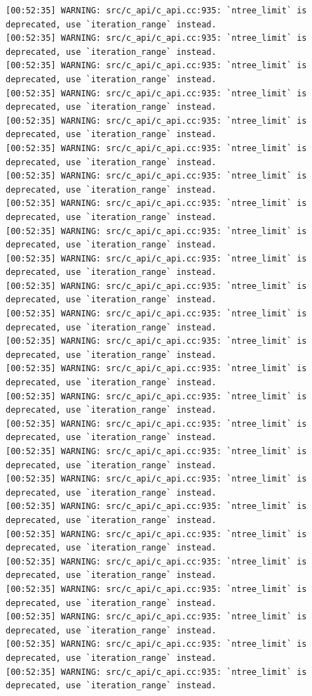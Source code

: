 \documentclass[
  letterpaper,
  DIV=11,
  numbers=noendperiod]{scrartcl}
\begin{document}
\begin{verbatim}
[00:52:35] WARNING: src/c_api/c_api.cc:935: `ntree_limit` is deprecated, use `iteration_range` instead.
[00:52:35] WARNING: src/c_api/c_api.cc:935: `ntree_limit` is deprecated, use `iteration_range` instead.
[00:52:35] WARNING: src/c_api/c_api.cc:935: `ntree_limit` is deprecated, use `iteration_range` instead.
[00:52:35] WARNING: src/c_api/c_api.cc:935: `ntree_limit` is deprecated, use `iteration_range` instead.
[00:52:35] WARNING: src/c_api/c_api.cc:935: `ntree_limit` is deprecated, use `iteration_range` instead.
[00:52:35] WARNING: src/c_api/c_api.cc:935: `ntree_limit` is deprecated, use `iteration_range` instead.
[00:52:35] WARNING: src/c_api/c_api.cc:935: `ntree_limit` is deprecated, use `iteration_range` instead.
[00:52:35] WARNING: src/c_api/c_api.cc:935: `ntree_limit` is deprecated, use `iteration_range` instead.
[00:52:35] WARNING: src/c_api/c_api.cc:935: `ntree_limit` is deprecated, use `iteration_range` instead.
[00:52:35] WARNING: src/c_api/c_api.cc:935: `ntree_limit` is deprecated, use `iteration_range` instead.
[00:52:35] WARNING: src/c_api/c_api.cc:935: `ntree_limit` is deprecated, use `iteration_range` instead.
[00:52:35] WARNING: src/c_api/c_api.cc:935: `ntree_limit` is deprecated, use `iteration_range` instead.
[00:52:35] WARNING: src/c_api/c_api.cc:935: `ntree_limit` is deprecated, use `iteration_range` instead.
[00:52:35] WARNING: src/c_api/c_api.cc:935: `ntree_limit` is deprecated, use `iteration_range` instead.
[00:52:35] WARNING: src/c_api/c_api.cc:935: `ntree_limit` is deprecated, use `iteration_range` instead.
[00:52:35] WARNING: src/c_api/c_api.cc:935: `ntree_limit` is deprecated, use `iteration_range` instead.
[00:52:35] WARNING: src/c_api/c_api.cc:935: `ntree_limit` is deprecated, use `iteration_range` instead.
[00:52:35] WARNING: src/c_api/c_api.cc:935: `ntree_limit` is deprecated, use `iteration_range` instead.
[00:52:35] WARNING: src/c_api/c_api.cc:935: `ntree_limit` is deprecated, use `iteration_range` instead.
[00:52:35] WARNING: src/c_api/c_api.cc:935: `ntree_limit` is deprecated, use `iteration_range` instead.
[00:52:35] WARNING: src/c_api/c_api.cc:935: `ntree_limit` is deprecated, use `iteration_range` instead.
[00:52:35] WARNING: src/c_api/c_api.cc:935: `ntree_limit` is deprecated, use `iteration_range` instead.
[00:52:35] WARNING: src/c_api/c_api.cc:935: `ntree_limit` is deprecated, use `iteration_range` instead.
[00:52:35] WARNING: src/c_api/c_api.cc:935: `ntree_limit` is deprecated, use `iteration_range` instead.
[00:52:35] WARNING: src/c_api/c_api.cc:935: `ntree_limit` is deprecated, use `iteration_range` instead.

\end{verbatim}
\end{document}
